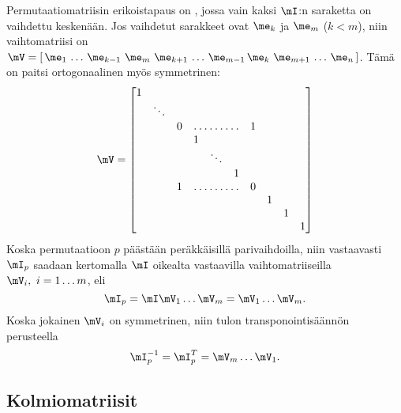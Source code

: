 Permutaatiomatriisin erikoistapaus on , jossa vain kaksi $\mI$:n saraketta
on vaihdettu keskenään. Jos vaihdetut sarakkeet ovat $\me_k$ ja $\me_m$ ($k<m$), niin
vaihtomatriisi on $\mV = [\,\me_1\,\ldots\,\me_{k-1}\ \me_m\ \me_{k+1}\,\ldots\,\me_{m-1}\,
\me_k\ \me_{m+1}\,\ldots\,\me_n\,]$. Tämä on paitsi ortogonaalinen myös symmetrinen:
\[
\mV= \begin{bmatrix}
1 \\
& \ddots \\
& & 0 & \hdotsfor{3} & 1 \\
& & & 1 \\
& & & & \ddots \\
& & & & & 1 \\
& & 1 & \hdotsfor{3} & 0 \\
& & & & & & & 1 \\
& & & & & & & & 1 \\
& & & & & & & & &1 \\
\end{bmatrix}
\]
Koska permutaatioon $p$ päästään peräkkäisillä parivaihdoilla, niin vastaavasti $\mI_p$
saadaan kertomalla $\mI$ oikealta vastaavilla vaihtomatriiseilla $\mV_i,\ i=1 \ldots m$, eli
\[
\mI_p = \mI\mV_1 \ldots \mV_m = \mV_1 \ldots \mV_m.
\]
Koska jokainen $\mV_i$ on symmetrinen, niin tulon transponointisäännön perusteella
\[
\mI_p^{-1} = \mI_p^T = \mV_m \ldots \mV_1.
\]

\subsection*{Kolmiomatriisit}

